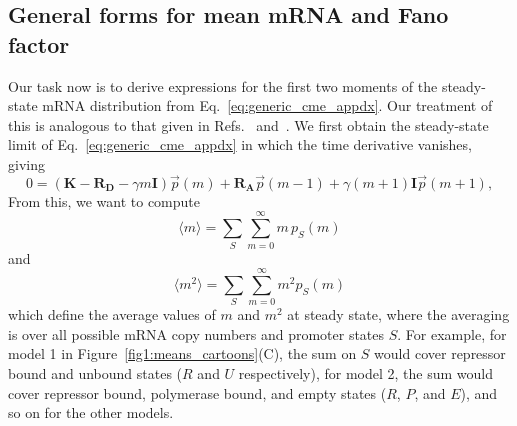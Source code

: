 \subsection{General forms for mean mRNA and Fano factor}
Our task now is to derive expressions for the first two moments of the
steady-state mRNA distribution from Eq.~\ref{eq:generic_cme_appdx}. Our
treatment of this is analogous to that given in Refs.~\cite{Sanchez2011}
and~\cite{Razo-Mejia2020}. We first obtain the steady-state limit of
Eq.~\ref{eq:generic_cme_appdx} in which the time derivative vanishes, giving
\begin{equation}
0 =
\left( \mathbf{K} - \mathbf{R_D} - \gamma m \mathbf{I} \right) \vec{p}(m)
                + \mathbf{R_A} \vec{p}(m-1) +
                \gamma (m+1) \mathbf{I} \vec{p}(m+1),
\label{eq:generic_cme_ss}
\end{equation}
From this, we want to compute
\begin{equation}
\langle{m}\rangle = \sum_S \sum_{m=0}^\infty m \, p_S(m)
\end{equation}
and
\begin{equation}
\langle{m^2}\rangle = \sum_S \sum_{m=0}^\infty m^2 p_S(m)
\end{equation}
which define the average values of $m$ and $m^2$ at steady state, where the
averaging is over all possible mRNA copy numbers and promoter states $S$. For
example, for model 1 in Figure~\ref{fig1:means_cartoons}(C), the sum on $S$
would cover repressor bound and unbound states ($R$ and $U$ respectively), for
model 2, the sum would cover repressor bound, polymerase bound, and empty
states ($R$, $P$, and $E$), and so on for the other models.

